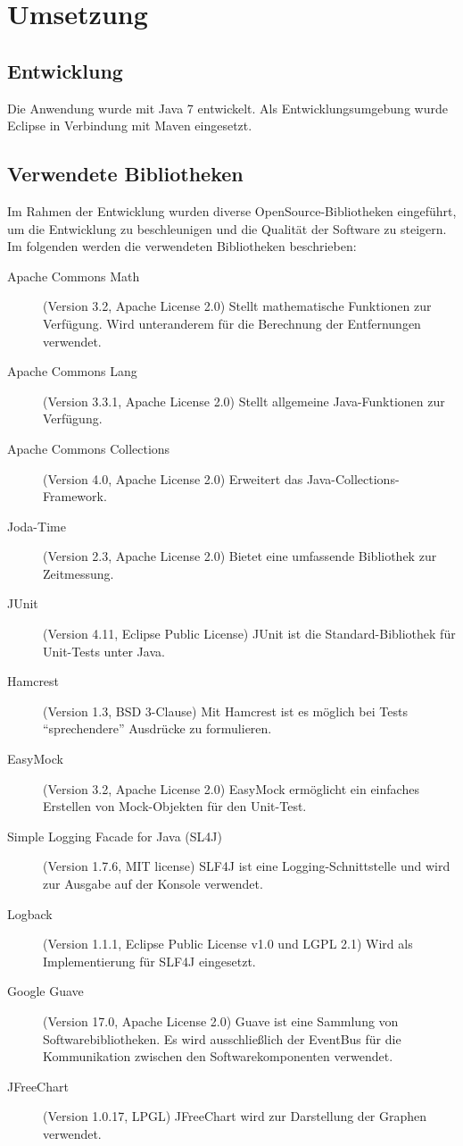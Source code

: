\section{Umsetzung}
\subsection{Entwicklung}
Die Anwendung wurde mit Java 7 entwickelt. Als Entwicklungsumgebung wurde Eclipse in Verbindung mit Maven eingesetzt. 

\subsection{Verwendete Bibliotheken}
Im Rahmen der Entwicklung wurden diverse OpenSource-Bibliotheken eingeführt, um die Entwicklung zu beschleunigen und die Qualität der Software zu steigern. Im folgenden werden die verwendeten Bibliotheken beschrieben:
\begin{description}
 \item[Apache Commons Math] (Version 3.2, Apache License 2.0) \cite{apache:CommonsMath} Stellt mathematische Funktionen zur Verfügung. Wird unteranderem für die Berechnung der Entfernungen verwendet.
 \item[Apache Commons Lang] (Version 3.3.1, Apache License 2.0) \cite{apache:CommonsLang} Stellt allgemeine Java-Funktionen zur Verfügung.
 \item[Apache Commons Collections] (Version 4.0, Apache License 2.0) \cite{apache:CommonsCollection} Erweitert das Java-Collec\-tions-Framework. 
 \item[Joda-Time] (Version 2.3, Apache License 2.0) \cite{joda:jodatime} Bietet eine umfassende Bibliothek zur Zeitmessung.
 \item[JUnit] (Version 4.11, Eclipse Public License) \cite{junit:junit} JUnit ist die Standard-Bibliothek für Unit-Tests unter Java. 
 \item[Hamcrest] (Version 1.3, BSD 3-Clause) \cite{hamcrest:hamcrest} Mit Hamcrest ist es möglich bei Tests "`sprechendere"' Ausdrücke zu formulieren.
 \item[EasyMock] (Version 3.2, Apache License 2.0) \cite{easymock:easymock} EasyMock ermöglicht ein einfaches Erstellen von Mock-Objekten für den Unit-Test.
 \item[Simple Logging Facade for Java (SL4J)] (Version 1.7.6, MIT license) \cite{qos:slfj} SLF4J ist eine Log\-ging-Schnittstelle und wird zur Ausgabe auf der Konsole verwendet.
 \item[Logback] (Version 1.1.1, Eclipse Public License v1.0 und LGPL 2.1) \cite{qos:logback} Wird als Implementierung für SLF4J eingesetzt.
 \item[Google Guave] (Version 17.0, Apache License 2.0) \cite{google:guave} Guave ist eine Sammlung von Softwarebibliotheken. Es wird ausschließlich der EventBus für die Kommunikation zwischen den Softwarekomponenten verwendet.
 \item[JFreeChart] (Version 1.0.17, LPGL) \cite{ObjectRefineryLimited:JFreeChart} JFreeChart wird zur Darstellung der Graphen verwendet.
\end{description}

